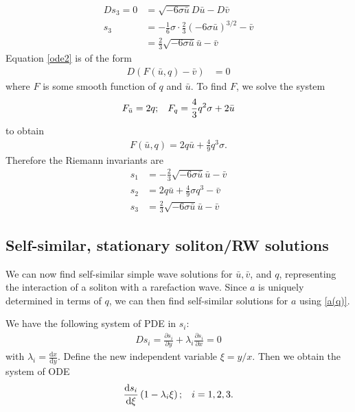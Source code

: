 \documentclass[12pt]{article}
\newcommand{\pd}[0]{\partial}
\newcommand{\dd}[0]{\mathrm{d}}
\numberwithin{equation}{section}
\begin{document}
\begin{align*}
    Ds_3 =0 &= \sqrt{-6\sigma \bar u}D\bar u - D\bar v \\
   s_3&= -\frac{1}{6}\sigma \cdot \frac{2}{3} (-6\sigma \bar u)^{3/2} - \bar v \\
    &= \frac{2}{3}\sqrt{-6\sigma \bar u}\bar u - \bar v
\end{align*}
Equation \eqref{ode2} is of the form 
\begin{align*}
    D\left(F(\bar u,q)-\bar v\right) &= 0
\end{align*}
where $F$ is some smooth function of $q$ and $\bar u$. To find $F$, we solve the system 
\begin{align}
    F_{\bar u} = 2q; \hspace{3mm} F_q = \frac{4}{3}q^2\sigma + 2\bar u
\end{align}
to obtain
\begin{align}
    F(\bar u, q) = 2q\bar u + \frac{4}{9}q^3\sigma.
\end{align}
Therefore the Riemann invariants are
\begin{subequations}
    \begin{align}
        s_{1} &= -\frac{2}{3}\sqrt{-6\sigma \bar u}\bar u - \bar v \label{s1}\\
        s_{2}&= 2q\bar u + \frac{4}{9}\sigma q^3 - \bar v \label{s2}\\
        s_{3} &= \frac{2}{3}\sqrt{-6\sigma \bar u}\bar u - \bar v \label{s3}
    \end{align} \label{riemann inv ito q}
\end{subequations}

\subsection{Self-similar, stationary soliton/RW solutions}
We can now find self-similar simple wave solutions for $\bar u,\bar v$, and $q$, representing the interaction of a soliton with a rarefaction wave. Since $a$ is uniquely determined in terms of $q$, we can then find self-similar solutions for $a$ using \eqref{a(q)}.

We have the following system of PDE in $s_i$:
\begin{align}
    Ds_i = \frac{\pd s_i}{\pd y} + \lambda_i\frac{\pd s_i}{\pd x} = 0 \label{PDEs for s_i}
\end{align}
with $\lambda_i = \frac{\dd x}{\dd y}$. Define the new independent variable $\xi = y/x$. Then we obtain the system of ODE
\begin{align}
    \frac{\dd s_i}{\dd \xi}\left(1-\lambda_i \xi\right); \hspace{3mm} i = 1,2,3. \label{ode for si in xi}
\end{align}
\end{document}
